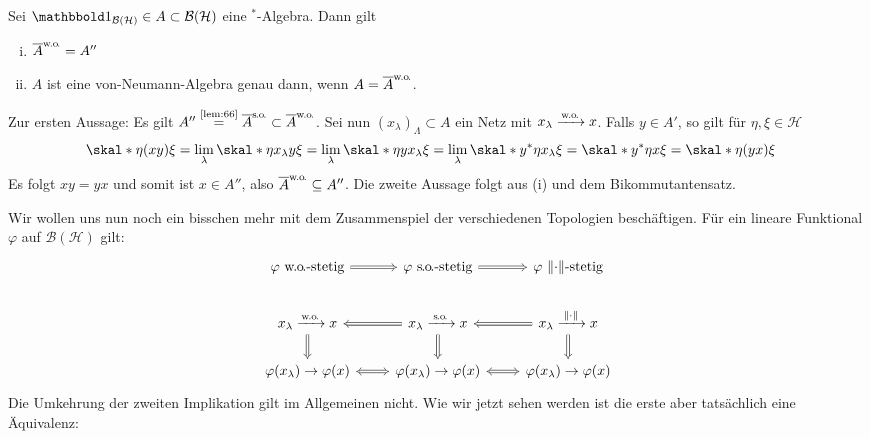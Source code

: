 \begin{satz}
	Sei $\ind_{\mathcal{B}(\mathcal{H})} \in A \subset \mathcal{B}(\mathcal{H})$ eine $^*$-Algebra. Dann gilt
	\begin{enumerate}[(i)]
		\item $\overline{A}^{\mathrm{w\mkern-1.7mu.\mkern-.45mu o\mkern-1.7mu.}} = A''$
		\item $A$ ist eine von-Neumann-Algebra genau dann, wenn $A= \overline{A}^{\mathrm{w\mkern-1.7mu.\mkern-.45mu o\mkern-1.7mu.}}$.
	\end{enumerate}
\end{satz}
\begin{beweis}
	Zur ersten Aussage: Es gilt $A'' \stackrel{\mbox{\scriptsize \ref{lem:66}}}{=}\overline{A}^{\mathrm{s\mkern-1.4mu.\mkern-.6mu o\mkern-1.7mu.}} \subset \overline{A}^{\mathrm{w\mkern-1.7mu.\mkern-.45mu o\mkern-1.7mu.}}$. 
	Sei nun $(x_\lambda)_\Lambda \subset A$ ein Netz mit $x_\lambda \grenzw{\wo} x$.
	Falls $y \in A'$, so gilt für $\eta,\xi \in \mathcal{H}$
	\begin{align}
		\skal*{\eta}{(x y)\xi} = \lim_\lambda \skal*{\eta}{x_\lambda y \xi	} =\lim_\lambda \skal*{\eta}{y x_\lambda \xi} = \lim_\lambda \skal*{y^* \eta}{ x_\lambda \xi} 
		&= \skal*{y^* \eta}{x \xi} = \skal*{\eta}{(yx) \xi}
	\end{align}
	Es folgt $xy=yx$ und somit ist $x \in A''$, also $\overline{A}^{\mathrm{w\mkern-1.7mu.\mkern-.45mu o\mkern-1.7mu.}} \subseteq A''$.
	Die zweite Aussage folgt aus (i) und dem Bikommutantensatz.
\end{beweis}

Wir wollen uns nun noch ein bisschen mehr mit dem Zusammenspiel der verschiedenen Topologien beschäftigen. 
Für ein lineare Funktional $\varphi$ auf $\mathcal{B}(\mathcal{H})$ gilt: 
\[
	\begin{tikzcd}
		\varphi \text{ $\wo$-stetig} \rar[Rightarrow] & \varphi \text{ $\so$-stetig}  \rar[Rightarrow] & \varphi \text{ $\norm*{\cdot}$-stetig} \\
		x_\lambda \grenzw{\wo}x \dar[Rightarrow]& x_\lambda\grenzw{\so}x \lar[Rightarrow]\dar[Rightarrow] & x_\lambda\grenzw{\norm*{\cdot}} x \lar[Rightarrow]\dar[Rightarrow] \\
		\varphi(x_\lambda) \to \varphi(x) \rar[Leftrightarrow] &\varphi(x_\lambda) \to \varphi(x) \rar[Leftrightarrow] & \varphi(x_\lambda)\to \varphi(x) 
	\end{tikzcd}
\]
Die Umkehrung der zweiten Implikation gilt im Allgemeinen nicht. 
Wie wir jetzt sehen werden ist die erste aber tatsächlich eine Äquivalenz:

